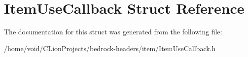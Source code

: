 \hypertarget{struct_item_use_callback}{}\section{Item\+Use\+Callback Struct Reference}
\label{struct_item_use_callback}


The documentation for this struct was generated from the following file\+:\begin{DoxyCompactItemize}
\item 
/home/void/\+C\+Lion\+Projects/bedrock-\/headers/item/Item\+Use\+Callback.\+h\end{DoxyCompactItemize}
